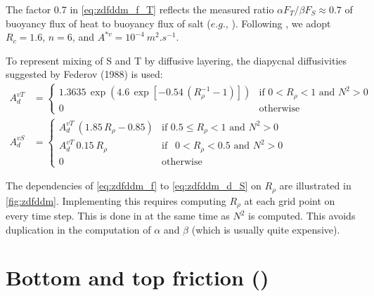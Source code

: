 \documentclass[../tex_main/NEMO_manual]{subfiles}
\begin{document}
The factor 0.7 in \autoref{eq:zdfddm_f_T} reflects the measured ratio 
$\alpha F_T /\beta F_S \approx  0.7$ of buoyancy flux of heat to buoyancy 
flux of salt ($e.g.$, \citet{McDougall_Taylor_JMR84}). Following  \citet{Merryfield1999}, 
we adopt $R_c = 1.6$, $n = 6$, and $A^{\ast v} = 10^{-4}~m^2.s^{-1}$.

To represent mixing of S and T by diffusive layering,  the diapycnal diffusivities suggested by Federov (1988) is used: 
\begin{align} 	\label{eq:zdfddm_d}
A_d^{vT} &= 	\begin{cases}
	1.3635 \, \exp{\left( 4.6\, \exp{ \left[  -0.54\,( R_{\rho}^{-1} - 1 )  \right] }    \right)}
									&\text{if  $0<R_\rho < 1$ and $N^2>0$ } \\
	0 								&\text{otherwise} 
				\end{cases}   
\\   			\label{eq:zdfddm_d_S}
A_d^{vS} &= 	\begin{cases}
	A_d^{vT}\ \left( 1.85\,R_{\rho} - 0.85 \right)
									&\text{if  $0.5 \leq R_\rho<1$ and $N^2>0$ } \\
	A_d^{vT} \ 0.15 \ R_\rho
									&\text{if  $\ \ 0 < R_\rho<0.5$ and $N^2>0$ } \\
	0 								&\text{otherwise} 
				\end{cases}   
\end{align}

The dependencies of \autoref{eq:zdfddm_f} to \autoref{eq:zdfddm_d_S} on $R_\rho$ 
are illustrated in \autoref{fig:zdfddm}. Implementing this requires computing 
$R_\rho$ at each grid point on every time step. This is done in  at the 
same time as $N^2$ is computed. This avoids duplication in the computation of 
$\alpha$ and $\beta$ (which is usually quite expensive).

\section{Bottom and top friction (\protect{})}
\label{sec:ZDF_bfr}

\end{document}
